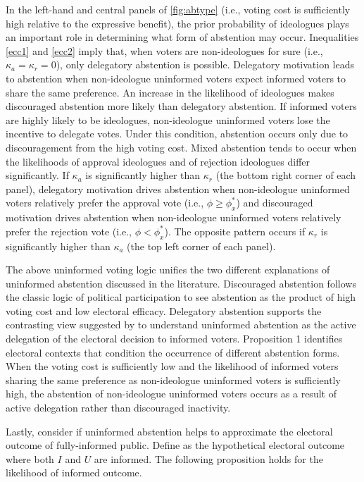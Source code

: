 \documentclass[letterpaper, 12pt]{article}
\begin{document}
    \par In the left-hand and central panels of \autoref{fig:abtype} (i.e., voting cost is sufficiently high relative to the expressive benefit), the prior probability of ideologues plays an important role in determining what form of abstention may occur. Inequalities \ref{ecc1} and \ref{ecc2} imply that, when voters are non-ideologues for sure (i.e., $\kappa_{a} = \kappa_{r} = 0$), only delegatory abstention is possible. Delegatory motivation leads to abstention when non-ideologue uninformed voters expect informed voters to share the same preference. An increase in the likelihood of ideologues makes discouraged abstention more likely than delegatory abstention. If informed voters are highly likely to be ideologues, non-ideologue uninformed voters lose the incentive to delegate votes. Under this condition, abstention occurs only due to discouragement from the high voting cost. Mixed abstention tends to occur when the likelihoods of approval ideologues and of rejection ideologues differ significantly. If $\kappa_a$ is significantly higher than $\kappa_r$ (the bottom right corner of each panel), delegatory motivation drives abstention when non-ideologue uninformed voters relatively prefer the approval vote (i.e., $\phi \geq \phi^*_x$) and discouraged motivation drives abstention when non-ideologue uninformed voters relatively prefer the rejection vote (i.e., $\phi < \phi^*_x$). The opposite pattern occurs if $\kappa_r$ is significantly higher than $\kappa_a$ (the top left corner of each panel).
    
    \par The above uninformed voting logic unifies the two different explanations of uninformed abstention discussed in the literature. Discouraged abstention follows the classic logic of political participation \citep{Downs1957anec} to see abstention as the product of high voting cost and low electoral efficacy. Delegatory abstention supports the contrasting view suggested by \cite{Feddersen1996thsw} to understand uninformed abstention as the active delegation of the electoral decision to informed voters. Proposition 1 identifies electoral contexts that condition the occurrence of different abstention forms. When the voting cost is sufficiently low and the likelihood of informed voters sharing the same preference as non-ideologue uninformed voters is sufficiently high, the abstention of non-ideologue uninformed voters occurs as a result of active delegation rather than discouraged inactivity.
    
    \par Lastly, consider if uninformed abstention helps to approximate the electoral outcome of fully-informed public. Define  as the hypothetical electoral outcome where both $I$ and $U$ are informed. The  following proposition holds for the likelihood of informed outcome.   
    
\end{document}
